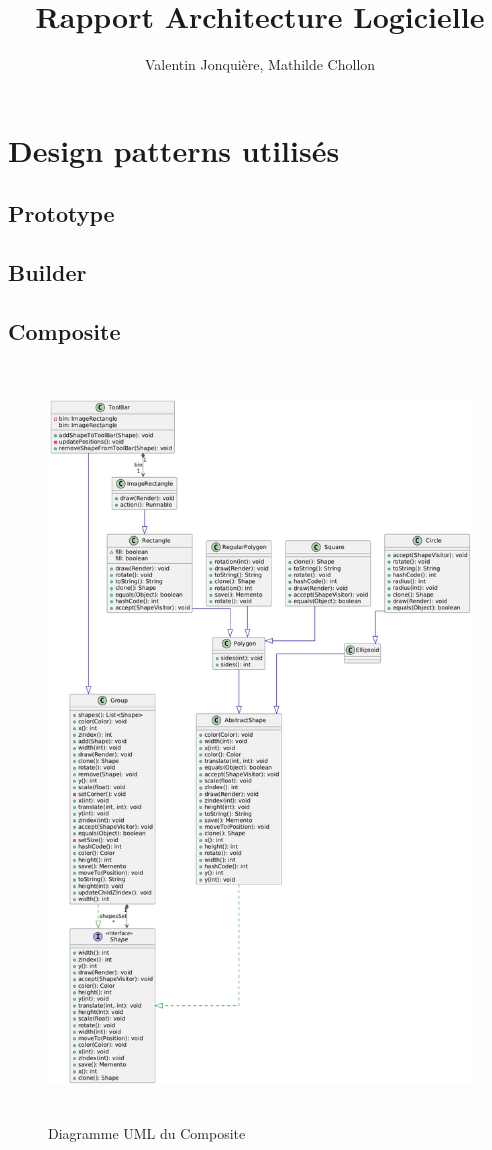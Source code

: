 \documentclass{article}
\author{
    Valentin Jonquière,
    Mathilde Chollon
}
\title{Rapport Architecture Logicielle}
\begin{document}
\maketitle

\pagebreak

\tableofcontents

\pagebreak

\section{Design patterns utilisés}

\subsection{Prototype}

\subsection{Builder}

\subsection{Composite}

\begin{figure}[h]
    \centering
    \includegraphics[width=\textwidth,height=20.0cm,keepaspectratio]{Composite.png}
    \caption{Diagramme UML du Composite}
    \label{Composite}
\end{figure}
\end{document}
